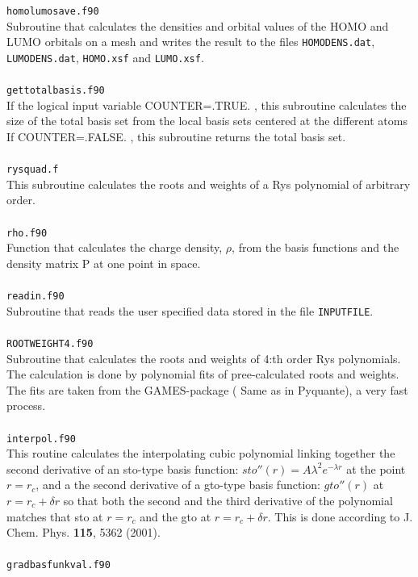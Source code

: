 \documentclass[a4paper,twoside,openany]{book}
\begin{document}
{{\texttt{homolumosave.f90}\\
Subroutine that calculates the densities and orbital values of the HOMO and LUMO orbitals on a mesh and writes the result to the files \texttt{HOMODENS.dat}, \texttt{LUMODENS.dat}, \texttt{HOMO.xsf} and \texttt{LUMO.xsf}. \\ \\
\texttt{gettotalbasis.f90}\\
If the logical input variable COUNTER=.TRUE. , this subroutine calculates the  size of the total basis set from the local basis sets centered  at the different atoms If COUNTER=.FALSE. , this subroutine returns the total basis set. \\ \\
\texttt{rysquad.f}\\
This subroutine calculates the roots and weights of a Rys polynomial of arbitrary order. \\ \\
\newpage
\noindent
\texttt{rho.f90}\\
Function that calculates the charge density, $\rho$,  from the basis functions 
and the density matrix P at one point in space. \\ \\
\texttt{readin.f90}\\
Subroutine that reads the user specified data stored in the file \texttt{INPUTFILE}. \\ \\
\texttt{ROOTWEIGHT4.f90}\\
Subroutine that calculates the roots and weights of 4:th order Rys polynomials. The calculation is done by 
polynomial fits of pree-calculated roots and weights. The fits are taken from the GAMES-package ( Same as in Pyquante), a very fast process. \\ \\
\texttt{interpol.f90}\\
This routine calculates the interpolating 
cubic polynomial linking together the 
second derivative of an sto-type basis function:
$sto''( r ) = A\lambda^{2}e^{-\lambda r}$ at the 
point $r = r_{c}$, and a the second derivative of a 
gto-type basis function: $gto''( r )$ at $r = r_{c} + \delta r$
so that both the second and the third derivative of the polynomial 
matches that sto at $r=r_{c}$ and the gto at $r=r_{c}+\delta r$. This is 
done according to J. Chem. Phys. {\bf 115}, 5362 (2001). \\ \\
\texttt{gradbasfunkval.f90}\\
}}
\end{document}
